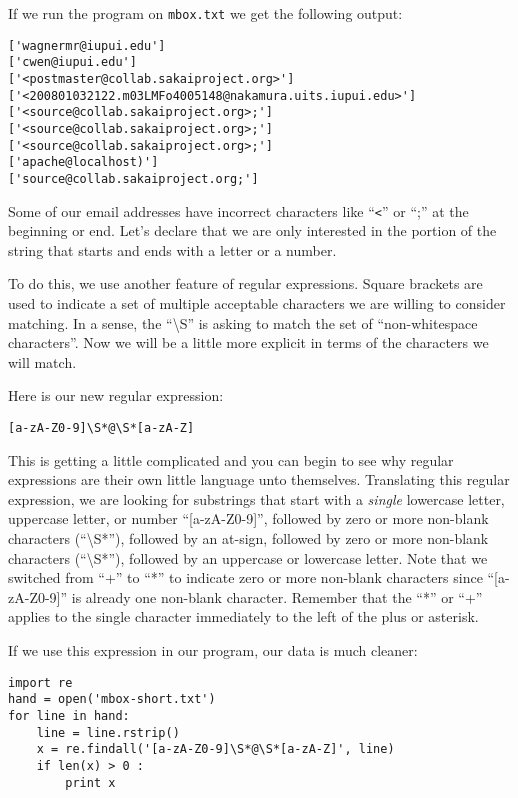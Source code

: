 If we run the program on {\tt mbox.txt} we get the following output:

\beforeverb
\begin{verbatim}
['wagnermr@iupui.edu']
['cwen@iupui.edu']
['<postmaster@collab.sakaiproject.org>']
['<200801032122.m03LMFo4005148@nakamura.uits.iupui.edu>']
['<source@collab.sakaiproject.org>;']
['<source@collab.sakaiproject.org>;']
['<source@collab.sakaiproject.org>;']
['apache@localhost)']
['source@collab.sakaiproject.org;']
\end{verbatim}
\afterverb
%
Some of our email addresses have incorrect characters like ``\verb"<"'' or ``;'' at the beginning
or end.   Let's declare that we are only interested in the portion of the string that starts and
ends with a letter or a number.

To do this, we use another feature of regular expressions.  Square brackets are used to indicate a
set of multiple acceptable characters we are willing to consider matching.  In a sense, the
``{\textbackslash}S'' is asking to match the set of ``non-whitespace characters''.  Now we will be
a little more explicit in terms of the characters we will match.

Here is our new regular expression:

\beforeverb
\begin{verbatim}
[a-zA-Z0-9]\S*@\S*[a-zA-Z]
\end{verbatim}
\afterverb
%
This is getting a little complicated and you can begin to see why regular expressions are their own
little language unto themselves.  Translating this regular expression, we are looking for substrings
that start with a {\em single} lowercase letter, uppercase letter, or number ``[a-zA-Z0-9]'', followed
by zero or more non-blank characters (``{\textbackslash}S*''), followed by an at-sign, followed by zero
or more non-blank characters (``{\textbackslash}S*''), followed by an uppercase or lowercase letter.
Note that we switched from ``+'' to ``*'' to indicate zero or more non-blank characters since ``[a-zA-Z0-9]''
is already one non-blank character.   Remember that the ``*'' or ``+'' applies to the single character
immediately to the left of the plus or asterisk.

If we use this expression in our program, our data is much cleaner:

\beforeverb
\begin{verbatim}
import re
hand = open('mbox-short.txt')
for line in hand:
    line = line.rstrip()
    x = re.findall('[a-zA-Z0-9]\S*@\S*[a-zA-Z]', line)
    if len(x) > 0 :
        print x
\end{verbatim}
\afterverb
%

